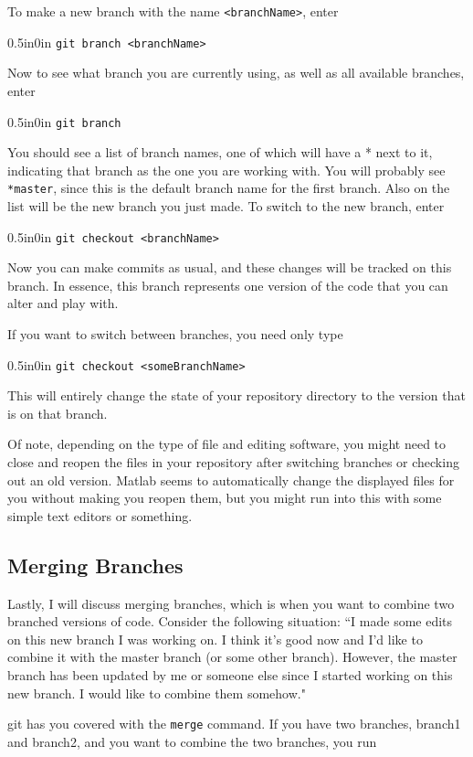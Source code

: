 \documentclass[11pt]{article}
\newcommand{\code}[1]{\begin{adjustwidth}{0.5in}{0in}
    \texttt{#1}
    \end{adjustwidth}}
\begin{document}
To make a new branch with the name \texttt{<branchName>}, enter

\code{git branch <branchName>}

Now to see what branch you are currently using, as well as all available branches, enter

\code{git branch}

You should see a list of branch names, one of which will have a * next to it, indicating that branch as the one you are working with.  You will probably see \texttt{*master}, since this is the default branch name for the first branch.  Also on the list will be the new branch you just made.  To switch to the new branch, enter

\code{git checkout <branchName>}

Now you can make commits as usual, and these changes will be tracked on this branch.  In essence, this branch represents one version of the code that you can alter and play with. 

If you want to switch between branches, you need only type

\code{git checkout <someBranchName>}

This will entirely change the state of your repository directory to the version that is on that branch.  

Of note, depending on the type of file and editing software, you might need to close and reopen the files in your repository after switching branches or checking out an old version.  Matlab seems to automatically change the displayed files for you without making you reopen them, but you might run into this with some simple text editors or something.

\subsection{Merging Branches}
\label{sec:Merging}

Lastly, I will discuss merging branches, which is when you want to combine two branched versions of code.  Consider the following situation:  ``I made some edits on this new branch I was working on.  I think it's good now and I'd like to combine it with the master branch (or some other branch).  However, the master branch has been updated by me or someone else since I started working on this new branch.  I would like to combine them somehow."

git has you covered with the \texttt{merge} command.  If you have two branches, branch1 and branch2, and you want to combine the two branches, you run
\end{document}
